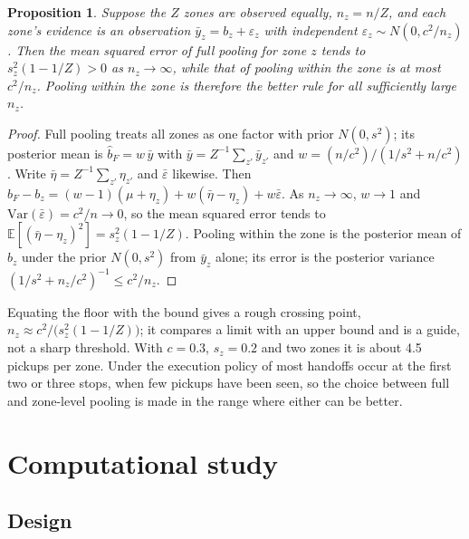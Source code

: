 \documentclass[preprint,authoryear,12pt]{elsarticle}
\newtheorem{proposition}{Proposition}
\newcommand{\E}{\mathbb{E}}
\begin{document}
\begin{proposition}\label{prop:threshold}
Suppose the $Z$ zones are observed equally, $n_z = n/Z$, and each zone's
evidence is an observation $\bar y_z = b_z + \varepsilon_z$ with
independent $\varepsilon_z \sim N(0, c^2/n_z)$. Then the mean squared
error of full pooling for zone $z$ tends to $s_z^2(1 - 1/Z) > 0$ as
$n_z \to \infty$, while that of pooling within the zone is at most
$c^2/n_z$. Pooling within the zone is therefore the better rule for all
sufficiently large $n_z$.
\end{proposition}

\begin{proof}
Full pooling treats all zones as one factor with prior $N(0,s^2)$; its
posterior mean is $\hat b_F = w\,\bar y$ with
$\bar y = Z^{-1}\sum_{z'} \bar y_{z'}$ and $w = (n/c^2)/(1/s^2 + n/c^2)$.
Write $\bar\eta = Z^{-1}\sum_{z'}\eta_{z'}$ and $\bar\varepsilon$
likewise. Then
$\hat b_F - b_z = (w-1)(\mu + \eta_z) + w(\bar\eta - \eta_z) +
w\bar\varepsilon$. As $n_z \to \infty$, $w \to 1$ and
$\mathrm{Var}(\bar\varepsilon) = c^2/n \to 0$, so the mean squared error
tends to $\E[(\bar\eta - \eta_z)^2] = s_z^2(1 - 1/Z)$. Pooling within
the zone is the posterior mean of $b_z$ under the prior $N(0,s^2)$ from
$\bar y_z$ alone; its error is the posterior variance
$(1/s^2 + n_z/c^2)^{-1} \le c^2/n_z$.
\end{proof}

Equating the floor with the bound gives a rough crossing point,
$n_z \approx c^2/\bigl(s_z^2(1-1/Z)\bigr)$; it compares a limit with an
upper bound and is a guide, not a sharp threshold. With $c = 0.3$,
$s_z = 0.2$ and two zones it is about 4.5 pickups per zone. Under the
execution policy of \citet{dang2026baton} most handoffs occur at the
first two or three stops, when few pickups have been seen, so the choice
between full and zone-level pooling is made in the range where either
can be better.

\section{Computational study}\label{sec:study}

\subsection{Design}
\end{document}
